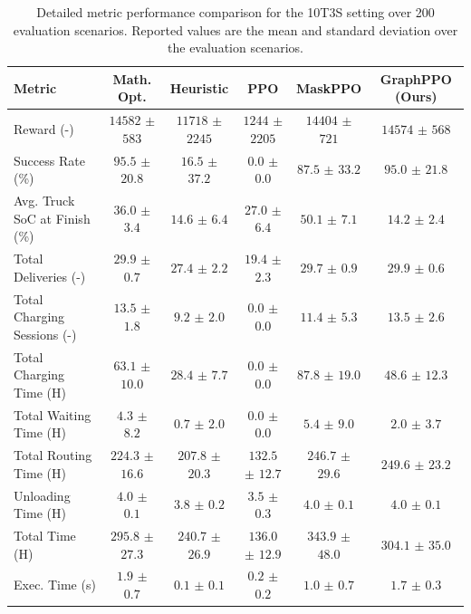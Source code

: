 \documentclass[a4paper,fleqn]{cas-sc}
\begin{document}
\begin{table}
\centering
\small
\caption{Detailed metric performance comparison for the 10T3S setting over 200 evaluation scenarios. Reported values are the mean and standard deviation over the evaluation scenarios.}
\begin{tabular}{@{}lccccc@{}}
\toprule
Metric & Math. Opt. & Heuristic & PPO & MaskPPO & GraphPPO (Ours) \\
\midrule
Reward (-) & $14582$ $\pm$ $583$ & $11718$ $\pm$ $2245$ & $1244$ $\pm$ $2205$ & $14404$ $\pm$ $721$ & $14574$ $\pm$ $568$ \\
Success Rate (\%) & $95.5$ $\pm$ $20.8$ & $16.5$ $\pm$ $37.2$ & $0.0$ $\pm$ $0.0$ & $87.5$ $\pm$ $33.2$ & $95.0$ $\pm$ $21.8$ \\
Avg. Truck SoC at Finish (\%) & $36.0$ $\pm$ $3.4$ & $14.6$ $\pm$ $6.4$ & $27.0$ $\pm$ $6.4$ & $50.1$ $\pm$ $7.1$ & $14.2$ $\pm$ $2.4$ \\
Total Deliveries (-) & $29.9$ $\pm$ $0.7$ & $27.4$ $\pm$ $2.2$ & $19.4$ $\pm$ $2.3$ & $29.7$ $\pm$ $0.9$ & $29.9$ $\pm$ $0.6$ \\
Total Charging Sessions (-) & $13.5$ $\pm$ $1.8$ & $9.2$ $\pm$ $2.0$ & $0.0$ $\pm$ $0.0$ & $11.4$ $\pm$ $5.3$ & $13.5$ $\pm$ $2.6$ \\
\midrule
Total Charging Time (H) & $63.1$ $\pm$ $10.0$ & $28.4$ $\pm$ $7.7$ & $0.0$ $\pm$ $0.0$ & $87.8$ $\pm$ $19.0$ & $48.6$ $\pm$ $12.3$ \\
Total Waiting Time (H) & $4.3$ $\pm$ $8.2$ & $0.7$ $\pm$ $2.0$ & $0.0$ $\pm$ $0.0$ & $5.4$ $\pm$ $9.0$ & $2.0$ $\pm$ $3.7$ \\
Total Routing Time (H) & $224.3$ $\pm$ $16.6$ & $207.8$ $\pm$ $20.3$ & $132.5$ $\pm$ $12.7$ & $246.7$ $\pm$ $29.6$ & $249.6$ $\pm$ $23.2$ \\
Unloading Time (H)& $4.0$ $\pm$ $0.1$ & $3.8$ $\pm$ $0.2$ & $3.5$ $\pm$ $0.3$ & $4.0$ $\pm$ $0.1$ & $4.0$ $\pm$ $0.1$ \\
Total Time (H) & $295.8$ $\pm$ $27.3$ & $240.7$ $\pm$ $26.9$ & $136.0$ $\pm$ $12.9$ & $343.9$ $\pm$ $48.0$ & $304.1$ $\pm$ $35.0$ \\
\midrule
Exec. Time (s) & $1.9$ $\pm$ $0.7$ & $0.1$ $\pm$ $0.1$ & $0.2$ $\pm$ $0.2$ & $1.0$ $\pm$ $0.7$ & $1.7$ $\pm$ $0.3$ \\
\bottomrule
\end{tabular}
\label{tab:10t3s_metrics}
\end{table}
\end{document}
